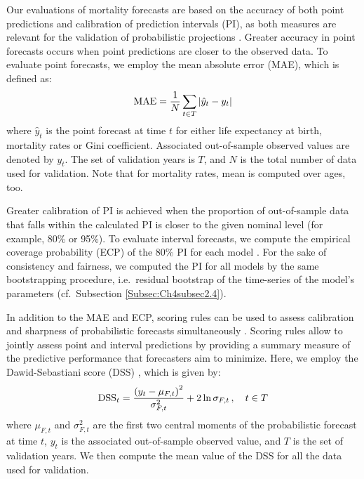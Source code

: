 \documentclass[Thesis]{subfiles}
\begin{document}
Our evaluations of mortality forecasts are based on the accuracy of both point predictions and calibration of prediction intervals (PI), as both measures are relevant for the validation of probabilistic projections \citep{chatfield2000time}. Greater accuracy in point forecasts occurs when point predictions are closer to the observed data. To evaluate point forecasts, we employ the mean absolute error (MAE), which is defined as:
%
\begin{equation}\label{Eq:MAE}
\mathrm{MAE} = \frac{1}{N} \sum_{t \in T} \left| \hat{y}_t - y_t \right|  \notag 
\end{equation}
% 
where $\hat{y}_t$ is the point forecast at time $t$ for either life expectancy at birth, mortality rates or Gini coefficient. Associated out-of-sample observed values are denoted by $y_t$. The set of validation years is $T$, and $N$ is the total number of data used for validation. Note that for mortality rates, mean is computed over ages, too. 

Greater calibration of PI is achieved when the proportion of out-of-sample data that falls within the calculated PI is closer to the given nominal level (for example, 80\% or 95\%). To evaluate interval forecasts, we compute the empirical coverage probability (ECP) of the 80\% PI for each model \cite[as in, for example,][]{shang2011point,raftery2013bayesian}. For the sake of consistency and fairness, we computed the PI for all models by the same bootstrapping procedure, i.e.~residual bootstrap of the time-series of the model's parameters (cf.~Subsection \ref{Subsec:Ch4subsec2.4}).

In addition to the MAE and ECP, scoring rules can be used to assess calibration and sharpness of probabilistic forecasts simultaneously \cite[for a review, see][]{gneiting2014probabilistic}. Scoring rules allow to jointly assess point and interval predictions by providing a summary measure of the predictive performance that forecasters aim to minimize. Here, we employ the Dawid-Sebastiani score (DSS) \citep{dawid1999coherent}, which is given by:
%
\begin{equation}\label{Eq:DSS}
\mathrm{DSS}_t = \frac{\left(y_t-\mu_{F,t}\right)^2}{\sigma^2_{F,t}} + 2 \ln \sigma_{F,t}  \,, \quad t \in T \notag 
\end{equation}
%
where $\mu_{F,t}$ and $\sigma^2_{F,t}$ are the first two central moments of the probabilistic forecast at time $t$, $y_t$ is the associated out-of-sample observed value, and $T$ is the set of validation years. We then compute the mean value of the DSS for all the data used for validation. 
\end{document}
